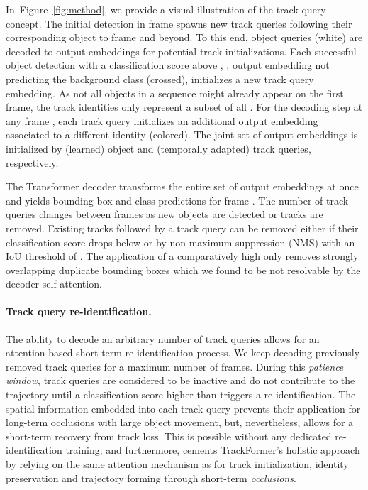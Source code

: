 \documentclass[10pt,twocolumn,letterpaper]{article}
\newcommand{\figref}[1]{Figure~\ref{#1}}
\begin{document}
In~\figref{fig:method}, we provide a visual illustration of the track query concept.
The initial detection in frame  spawns new track queries following their corresponding object to frame  and beyond.
To this end,  object queries (white) are decoded to output embeddings for potential track initializations.
Each successful object detection  with a classification score above , \ie, output embedding not predicting the background class (crossed), initializes a new track query embedding.
As not all objects in a sequence might already appear on the first frame, the track identities  only represent a subset of all .
For the decoding step at any frame , each track query initializes an additional output embedding associated to a different identity (colored).
The joint set of  output embeddings is initialized by (learned) object and (temporally adapted) track queries, respectively.


The Transformer decoder transforms the entire set of output embeddings at once and yields bounding box and class predictions for frame .
The number of track queries  changes between frames as new objects are detected or tracks are removed.
Existing tracks followed by a track query can be removed either if their classification score drops below  or by non-maximum suppression (NMS) with an IoU threshold of . The application of a comparatively high  only removes strongly overlapping duplicate bounding boxes which we found to be  not resolvable by the decoder self-attention.


\paragraph{Track query re-identification.}

The ability to decode an arbitrary number of track queries allows for an attention-based short-term re-identification process.
We keep decoding previously removed track queries for a maximum number of  frames.
During this \textit{patience window}, track queries are considered to be inactive and do not contribute to the trajectory until a classification score higher than  triggers a re-identification.
The spatial information embedded into each track query prevents their application for long-term occlusions with large object movement, but, nevertheless, allows for a short-term recovery from track loss.
This is possible without any dedicated re-identification training; and furthermore, cements \mbox{TrackFormer}'s holistic approach by relying on the same attention mechanism as for track initialization, identity preservation and trajectory forming through short-term \textit{occlusions}.
\end{document}
